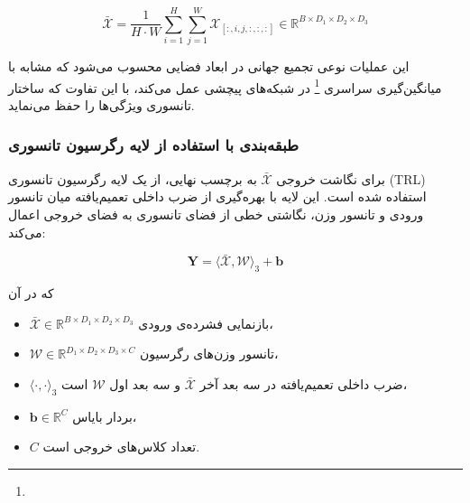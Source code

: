 \begin{equation}
	\bar{\mathcal{X}} = \frac{1}{H \cdot W} \sum_{i=1}^{H} \sum_{j=1}^{W} \mathcal{X}_{[:, i, j, :, :, :]} 
	\in \mathbb{R}^{B \times D_1 \times D_2 \times D_3}
\end{equation}


این عملیات نوعی تجمیع جهانی در ابعاد فضایی محسوب می‌شود که مشابه با میانگین‌گیری سراسری \footnote{}  در شبکه‌های پیچشی عمل می‌کند، با این تفاوت که ساختار تانسوری ویژگی‌ها را حفظ می‌نماید.

\subsubsection*{طبقه‌بندی با استفاده از لایه رگرسیون تانسوری}

برای نگاشت خروجی $\bar{\mathcal{X}}$ به برچسب نهایی، از یک لایه رگرسیون تانسوری (TRL) استفاده شده است. این لایه با بهره‌گیری از ضرب داخلی تعمیم‌یافته میان تانسور ورودی و تانسور وزن، نگاشتی خطی از فضای تانسوری به فضای خروجی اعمال می‌کند:

\begin{equation}
	\mathbf{Y} = \langle \bar{\mathcal{X}}, \mathcal{W} \rangle_3 + \mathbf{b}
\end{equation}

که در آن
\begin{itemize}
	\item $\bar{\mathcal{X}} \in \mathbb{R}^{B \times D_1 \times D_2 \times D_3}$ بازنمایی فشرده‌ی ورودی،
	\item $\mathcal{W} \in \mathbb{R}^{D_1 \times D_2 \times D_3 \times C}$ تانسور وزن‌های رگرسیون،
	\item $\langle \cdot, \cdot \rangle_3$ ضرب داخلی تعمیم‌یافته در سه بعد آخر $\bar{\mathcal{X}}$ و سه بعد اول $\mathcal{W}$ است،
	\item $\mathbf{b} \in \mathbb{R}^{C}$ بردار بایاس،
	\item $C$ تعداد کلاس‌های خروجی است.
\end{itemize}









